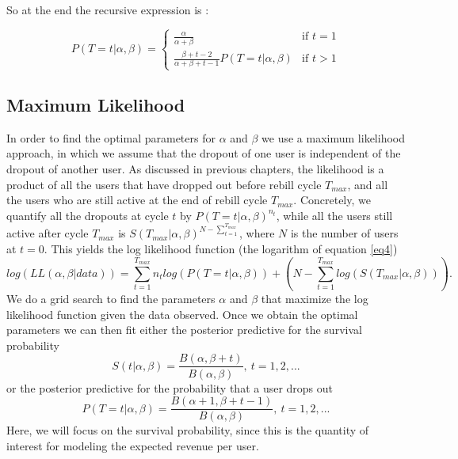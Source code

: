 \documentclass[paper=a4, fontsize=11pt]{scrartcl} %
\numberwithin{equation}{section} %
\numberwithin{figure}{section} %
\numberwithin{table}{section} %
\begin{document}
	So at the end the recursive expression  is : 
	
	\begin{equation} \label{eq5}
	P(T=t | \alpha, \beta) = 
	\left\{
	\begin{array}{ll}
	\frac{\alpha}{\alpha + \beta}  & \mbox{if } t =1 \\
	\frac{\beta + t -2}{\alpha + \beta + t -1}P(T=t|\alpha,\beta) & \mbox{if } t > 1
	\end{array}
	\right.
	\end{equation}


\subsection{Maximum Likelihood}
In order to find the optimal parameters for $\alpha$ and $\beta$ we use a maximum likelihood approach, in which we assume that the dropout of one user is independent of the dropout of another user.
As discussed in previous chapters, the likelihood is a product of all the users that have dropped out before rebill cycle $T_{max}$, and all the users who are still active at the end of rebill cycle $T_{max}$. Concretely, we quantify all the dropouts at cycle $t$ by $P(T = t | \alpha, \beta)^{n_t}$, while all the users still active after cycle $T_{max}$ is $S(T_{max} | \alpha, \beta)^{N - \sum_{t=1}^{T_{max}}}$, where $N$ is the number of users at $t = 0$. This yields the log likelihood function (the logarithm of equation  \ref{eq4})
\begin{equation}
	log(LL(\alpha, \beta | data)) = \sum_{t=1}^{T_{max}} n_t log(P(T = t | \alpha, \beta)) + \left(N - \sum_{t=1}^{T_{max}} log(S(T_{max} | \alpha, \beta)) \right).
\end{equation} 
We do a grid search to find the parameters $\alpha$ and $\beta$ that maximize the log likelihood function given the data observed. Once we obtain the optimal parameters we can then fit either the posterior predictive 
for the survival probability\\ 
\begin{equation}
S(t | \alpha, \beta) = \frac{B(\alpha, \beta + t)}{B(\alpha, \beta)}, ~ t = 1,2,...
\label{eq:survival_fct}
\end{equation}
or the posterior predictive for the probability that a user drops out\\
\begin{equation}
P(T = t | \alpha, \beta) = \frac{B(\alpha + 1, \beta + t - 1)}{B(\alpha, \beta)}, ~ t = 1,2,...
\end{equation}
Here, we will focus on the survival probability, since this is the quantity of interest for modeling the expected revenue per user.
\end{document}
